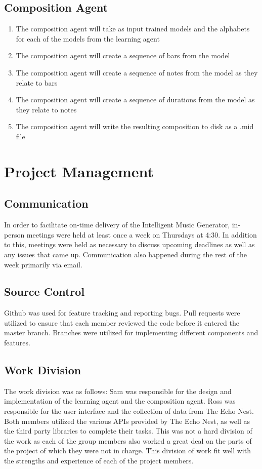\documentclass{article}
\begin{document}
\subsection{Composition Agent}
 \begin{enumerate}
 \item The composition agent will take as input trained models and the alphabets for each of the models from the learning agent
 \item The composition agent will create a sequence of bars from the model
 \item The composition agent will create a sequence of notes from the model as they relate to bars
 \item The composition agent will create a sequence of durations from the model as they relate to notes
 \item The composition agent will write the resulting composition to disk as a .mid file
 \end{enumerate}

\section{Project Management}
\subsection{Communication}
 In order to facilitate on-time delivery of the Intelligent Music Generator, in-person meetings
 were held at least once a week on Thursdays at 4:30. In addition to this, meetings were
 held as necessary to discuss upcoming deadlines as well as any issues that came up.
 Communication also happened during the rest of the week primarily via email.

\subsection{Source Control}
 Github was used for feature tracking and reporting bugs.  Pull requests were utilized to
 ensure that each member reviewed the code before it entered the master branch.  Branches 
 were utilized for implementing different components and features.

\subsection{Work Division}
The work division was as follows: Sam was responsible for the design and implementation of the learning agent and the composition agent. Ross was responsible for the user interface and the collection of data from The Echo Nest. Both members utilized the various APIs provided by The Echo Nest, as well as the third party libraries to complete their tasks. This was not a hard division of the work as each of the group members also worked a great deal on the parts of the project of which they were not in charge. This division of work fit well with the strengths and experience of each of the project members.
\end{document}
